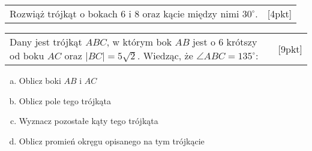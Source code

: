 \documentclass[12pt,a4paper]{article}
\begin{document}
\begin{enumerate}[1.]
		\begin{tabular}{p{13cm} r}
	\item Rozwiąż trójkąt o bokach 6 i 8 oraz kącie między nimi $30^\circ$. &[4pkt]\\ 
\end{tabular}

		
		\begin{tabular}{p{13cm} r}
	\item Dany jest trójkąt $ABC$, w którym bok $AB$ jest o 6 krótszy od boku $AC$ oraz $|BC|=5\sqrt{2}$. Wiedząc, że $\angle ABC = 135^\circ$: &[9pkt]\\ 
\end{tabular}

\begin{enumerate}[a)]
	\item Oblicz boki $AB$ i $AC$
	\item Oblicz pole tego trójkąta
	\item Wyznacz pozostałe kąty tego trójkąta
	\item Oblicz promień okręgu opisanego na tym trójkącie
\end{enumerate}
		
	\end{enumerate}
	
\end{document}

